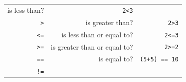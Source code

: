 \documentclass[]{book}
\begin{document}
\begin{longtable}[]{@{}rrr@{}}
\begin{minipage}[t]{0.30\columnwidth}
is less than?\strut
\end{minipage} & \begin{minipage}[t]{0.30\columnwidth}\raggedleft
\texttt{2\textless{}3}\strut
\end{minipage}\tabularnewline
\begin{minipage}[t]{0.30\columnwidth}\raggedleft
\texttt{\textgreater{}}\strut
\end{minipage} & \begin{minipage}[t]{0.30\columnwidth}\raggedleft
is greater than?\strut
\end{minipage} & \begin{minipage}[t]{0.30\columnwidth}\raggedleft
\texttt{2\textgreater{}3}\strut
\end{minipage}\tabularnewline
\begin{minipage}[t]{0.30\columnwidth}\raggedleft
\texttt{\textless{}=}\strut
\end{minipage} & \begin{minipage}[t]{0.30\columnwidth}\raggedleft
is less than or equal to?\strut
\end{minipage} & \begin{minipage}[t]{0.30\columnwidth}\raggedleft
\texttt{2\textless{}=3}\strut
\end{minipage}\tabularnewline
\begin{minipage}[t]{0.30\columnwidth}\raggedleft
\texttt{\textgreater{}=}\strut
\end{minipage} & \begin{minipage}[t]{0.30\columnwidth}\raggedleft
is greater than or equal to?\strut
\end{minipage} & \begin{minipage}[t]{0.30\columnwidth}\raggedleft
\texttt{2\textgreater{}=2}\strut
\end{minipage}\tabularnewline
\begin{minipage}[t]{0.30\columnwidth}\raggedleft
\texttt{==}\strut
\end{minipage} & \begin{minipage}[t]{0.30\columnwidth}\raggedleft
is equal to?\strut
\end{minipage} & \begin{minipage}[t]{0.30\columnwidth}\raggedleft
\texttt{(5+5)\ ==\ 10}\strut
\end{minipage}\tabularnewline
\begin{minipage}[t]{0.30\columnwidth}\raggedleft
\texttt{!=}\strut
\end{minipage} & \begin{minipage}[t]{0.30\columnwidth}\raggedleft

\end{minipage}
\end{longtable}
\end{document}
